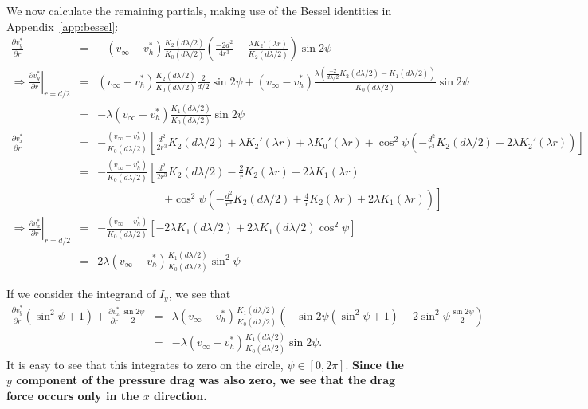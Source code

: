 \documentclass[11pt]{amsart}
\newcommand{\vinf}{v_{\infty}}
\newcommand{\baa}[1]{\begin{eqnarray} #1 \end{eqnarray}}
\newcommand{\baas}[1]{\begin{eqnarray*} #1 \end{eqnarray*}}
\newcommand{\pd}[2]{\ensuremath{\frac{\partial #1}{\partial #2}}}
\begin{document}
	We now calculate the remaining partials, making use of the Bessel identities in Appendix~\ref{app:bessel}:
	\baa{
	\pd{v_y^*}{r} &=& - (\vinf-v_h^*)\frac{K_2(d\lambda/2)}{K_0(d\lambda/2)}\left( \frac{-2d^2}{4r^3} -\frac{\lambda K_2'(\lambda r)}{K_2(d\lambda/2)} \right)\sin2\psi \nonumber \\
	\Rightarrow \left . \pd{v_y^*}{r}\right\vert_{r=d/2} &=& (\vinf-v_h^*)\frac{K_2(d\lambda/2)}{K_0(d\lambda/2)}\frac{2}{d/2}\sin2\psi + (\vinf-v_h^*)\frac{\lambda \left(\frac{-2}{d\lambda/2} K_2(d\lambda/2) - K_1(d\lambda/2)\right)}{K_0(d\lambda/2)}\sin2\psi \nonumber \\
	&=& -\lambda (\vinf-v_h^*)\frac{K_1(d\lambda/2)}{K_0(d\lambda/2)}\sin2\psi \label{eqn:vyr} \\
	\pd{v_x^*}{r} &=& -\frac{(\vinf-v_h^*)}{K_0(d\lambda/2)}\left[ \frac{d^2}{2r^3}K_2(d\lambda/2) + \lambda K_2'(\lambda r) + \lambda K_0'(\lambda r) + \cos^2\psi\left( -\frac{d^2}{r^3}K_2(d\lambda/2) - 2\lambda K_2'(\lambda r) \right)  \right ] \nonumber \\
	&=& -\frac{(\vinf-v_h^*)}{K_0(d\lambda/2)}\left[ \frac{d^2}{2r^3}K_2(d\lambda/2) - \frac{2}{r} K_2(\lambda r) - 2\lambda K_1(\lambda r) \right. \nonumber \\
	&& \qquad \qquad \qquad \left. + \cos^2\psi\left( -\frac{d^2}{r^3}K_2(d\lambda/2) + \frac{4}{r} K_2(\lambda r) +2\lambda K_1(\lambda r)\right)  \right ] \nonumber \\
	\Rightarrow \left . \pd{v_x^*}{r}\right\vert_{r=d/2} &=& -\frac{(\vinf-v_h^*)}{K_0(d\lambda/2)}\left[ -2\lambda K_1(d\lambda/2) +2\lambda K_1(d\lambda/2) \cos^2\psi\right] \nonumber \\
	&=& 2\lambda (\vinf-v_h^*)\frac{K_1(d\lambda/2 )}{K_0(d\lambda/2)}\sin^2\psi  \label{eqn:vxr} 
	}
	
	If we consider the integrand of $I_y$, we see that 
	\baas{
	\pd{v_y^*}{r}(\sin^2\psi+1) + \pd{v_x^*}{r} \frac{\sin 2\psi}{2} &=& \lambda (\vinf-v_h^*)\frac{K_1(d\lambda/2)}{K_0(d\lambda/2)}\left(-\sin2\psi(\sin^2\psi+1) + 2\sin^2\psi \frac{\sin 2\psi}{2}\right) \\
	&=& -\lambda (\vinf-v_h^*)\frac{K_1(d\lambda/2)}{K_0(d\lambda/2)}\sin2\psi.
	}
	It is easy to see that this integrates to zero on the circle, $\psi \in [0,2\pi]$. \textbf{Since the $y$ component of the pressure drag was also zero, we see that the drag force occurs only in the $x$ direction.} 
	
\end{document}
